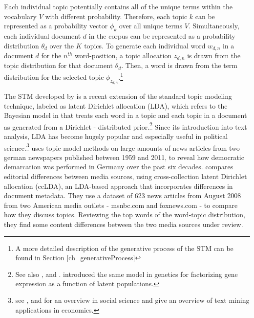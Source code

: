 \documentclass[12pt,a4paper,notitlepage]{article}
\begin{document}
Each individual topic potentially contains all of the unique terms within the vocabulary $V$ with different probability. Therefore, each topic $k$ can be represented as a probability vector $\phi_k$ over all unique terms $V$. Simultaneously, each individual document $d$ in the corpus can be represented as a probability distribution $\theta_d$ over the $K$ topics. To generate each individual word $w_{d,n}$ in a document $d$ for the $n^{th}$ word-position, a topic allocation $z_{d,n}$ is drawn from the topic distribution for that document $\theta_d$. Then, a word is drawn from the term distribution for the selected topic $\phi_{z_{d,n}}$.\footnote{A more detailed description of the generative process of the STM can be found in Section \ref{ch_generativeProcess}}

The STM developed by \citet{roberts_model_2016} is a recent extension of the standard topic modeling technique, labeled as latent Dirichlet allocation (LDA), which refers to the Bayesian model in \citet{blei_latent_2003} that treats each word in a topic and each topic in a document as generated from a Dirichlet - distributed prior.\footnote{See also \citet{griffiths_probabilistic_2002}, \citet{griffiths_finding_2004} and \citet{hofmann_probabilistic_1999}. \citet{pritchard_inference_2000} introduced the same model in genetics for factorizing gene expression as a function of latent populations.} Since its introduction into text analysis, LDA has become hugely popular and especially useful in political science.\footnote{see \citet{blei_probabilistic_2012}, \citet{grimmer_text_2013} and \citet{wiedmann_text_2016} for an overview in social science and \citet{gentzkow_text_2017} give an overview of text mining applications in economics.} \citet{wiedmann_text_2016} uses topic model methods on large amounts of news articles from two german newspapers published between 1959 and 2011, to reveal how democratic demarcation was performed in Germany over the past six decades. \citet{paul_cross-collection_2017} compares editorial differences between media sources, using cross-collection latent Dirichlet allocation (ccLDA), an LDA-based approach that incorporates differences in document metadata. They use a dataset of 623 news articles from August 2008 from two American media outlets - msnbc.com and foxnews.com - to compare how they discuss topics. Reviewing the top words of the word-topic distribution, they find some content differences between the two media sources under review. 
\end{document}
